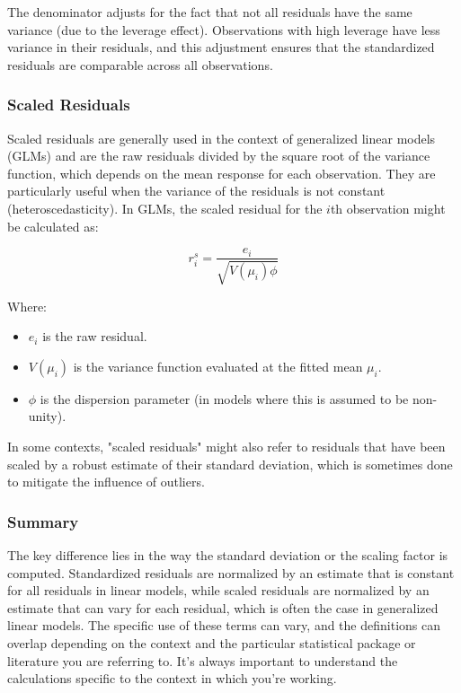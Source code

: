 \documentclass{article}
\begin{document}
The denominator adjusts for the fact that not all residuals have the same variance (due to the leverage effect). Observations with high leverage have less variance in their residuals, and this adjustment ensures that the standardized residuals are comparable across all observations.

\subsubsection{Scaled Residuals}
Scaled residuals are generally used in the context of generalized linear models (GLMs) and are the raw residuals divided by the square root of the variance function, which depends on the mean response for each observation. They are particularly useful when the variance of the residuals is not constant (heteroscedasticity). In GLMs, the scaled residual for the \(i\)th observation might be calculated as:

\[ r_i^s = \frac{e_i}{\sqrt{V(\mu_i) \phi}} \]

Where:
\begin{itemize}
    \item  \( e_i \) is the raw residual.
    \item \( V(\mu_i) \) is the variance function evaluated at the fitted mean \(\mu_i\).
    \item \( \phi \) is the dispersion parameter (in models where this is assumed to be non-unity).
\end{itemize}

In some contexts, "scaled residuals" might also refer to residuals that have been scaled by a robust estimate of their standard deviation, which is sometimes done to mitigate the influence of outliers.

\subsubsection{Summary}
The key difference lies in the way the standard deviation or the scaling factor is computed. Standardized residuals are normalized by an estimate that is constant for all residuals in linear models, while scaled residuals are normalized by an estimate that can vary for each residual, which is often the case in generalized linear models. The specific use of these terms can vary, and the definitions can overlap depending on the context and the particular statistical package or literature you are referring to. It's always important to understand the calculations specific to the context in which you're working.
\end{document}
